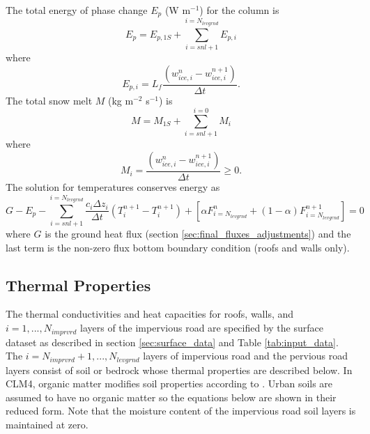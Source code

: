 \documentclass[12pt,authoryear]{elsarticle}
\numberwithin{equation}{section} %
\begin{document}
The total energy of phase change $E_{p}$ (W m$^{-1}$) for the column is
\begin{equation}
E_{p}=E_{p,1S}+\sum_{i=snl+1}^{i=N_{levgrnd}}E_{p,i}
\end{equation}
where
\begin{equation}
E_{p,i} = L_{f}\frac{(w_{ice,i}^{n}-w_{ice,i}^{n+1})}{\Delta t}.
\end{equation}
The total snow melt $M$ (kg m$^{-2}$ s$^{-1}$) is
\begin{equation}
M=M_{1S}+\sum_{i=snl+1}^{i=0}M_{i}
\end{equation}
where
\begin{equation}
M_{i} = \frac{(w_{ice,i}^{n}-w_{ice,i}^{n+1})}{\Delta t} \geq 0.
\end{equation}
The solution for temperatures conserves energy as
\begin{equation}
G-E_{p}-\sum_{i=snl+1}^{i=N_{levgrnd}}\frac{c_{i}\Delta z_{i}}{\Delta t}(T_{i}^{n+1}-T_{i}^{n+1})+\left[\alpha F_{i=N_{levgrnd}}^{n}+(1-\alpha)F_{i=N_{levgrnd}}^{n+1}\right]=0
\end{equation}
where $G$ is the ground heat flux (section \ref{sec:final_fluxes_adjustments}) and the last term is the non-zero flux bottom boundary condition (roofs and walls only).

\subsection{Thermal Properties}
\label{eq:thermal_properties}
%
The thermal conductivities and heat capacities for roofs, walls, and $i=1,...,N_{imprvrd}$ layers of the impervious road are specified by the surface dataset as described in section \ref{sec:surface_data} and Table \ref{tab:input_data}. The $i=N_{imprvrd}+1,...,N_{levgrnd}$ layers of impervious road and the
pervious road layers consist of soil or bedrock whose thermal properties are described below. In CLM4, organic matter modifies soil properties according to \cite{lawrenceIncorporatingOrganicSoil2008}. Urban soils are assumed to have no organic matter so the equations below are shown in their reduced form. Note that the moisture content of the impervious road soil layers is maintained at zero.
\end{document}
